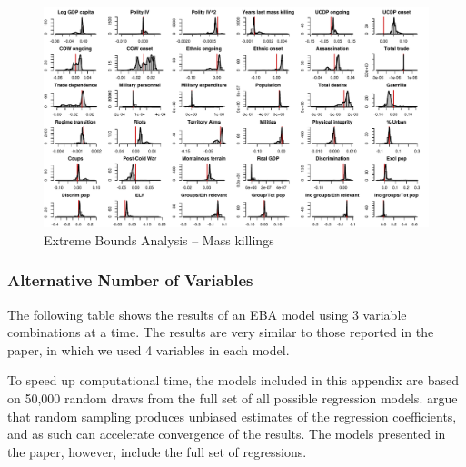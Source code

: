 \clearpage
\begin{figure}
    \centering
    \includegraphics[width=\textwidth]{images/mk.pdf}
    \caption{Extreme Bounds Analysis -- Mass killings}
    \label{fig:hist-mk}
\end{figure}
\clearpage

\newpage


\subsubsection{Alternative Number of Variables}

The following table shows the results of an EBA model using 3 variable combinations at a time. The results are very similar to those reported in the paper, in which we used 4 variables in each model.

To speed up computational time, the models included in this appendix are based on 50,000 random draws from the full set of all possible regression models. \citet[819]{salaimartin2004determinants} argue that random sampling produces unbiased estimates of the regression coefficients, and as such can accelerate convergence of the results. The models presented in the paper, however, include the full set of regressions.

